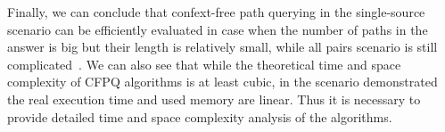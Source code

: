 Finally, we can conclude that confext-free path querying in the single-source scenario can be efficiently evaluated in case when the number of paths in the  answer is big but their length is relatively small, while all pairs scenario is still complicated~\cite{10.1145/3335783.3335791}.
We can also see that while the theoretical time and space complexity of CFPQ algorithms is at least cubic, in the scenario demonstrated the real execution time and used memory are linear.
Thus it is necessary to provide detailed time and space complexity analysis of the algorithms.